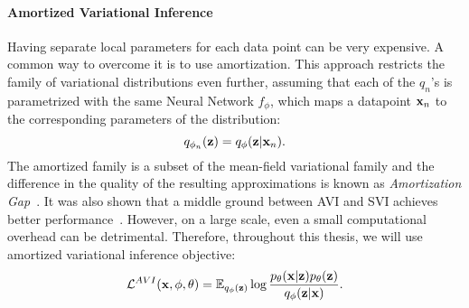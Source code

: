 \paragraph{Amortized Variational Inference}
Having separate local parameters for each data point can be very expensive. 
A common way to overcome it is to use amortization. This approach restricts the family of variational distributions even further, assuming that each of the $q_n$'s is parametrized with the same Neural Network $f_{\phi}$, which maps a datapoint ${\mathbf{x}}_n$ to the corresponding parameters of the distribution: 
\begin{equation}
    q_{\phi_n}({\mathbf{z}}) = q_{\phi}({\mathbf{z}} |{\mathbf{x}}_n).
\end{equation}
The amortized family is a subset of the mean-field variational family and the difference in the quality of the resulting approximations is known as \textit{Amortization Gap}~\citep{cremer2018inference}. It was also shown that a middle ground between AVI and SVI achieves better performance~\citep{kim2018semi}. However, on a large scale, even a small computational overhead can be detrimental. Therefore, throughout this thesis, we will use amortized variational inference objective:
\begin{equation}\label{eq:intro_avi}
     \mathcal{L}^{AVI}(\rvx, \phi, \theta) =  \E_{q_{\phi}(\rvz)}\log  \frac{p_{\theta}(\rvx|\rvz)p_{\theta}(\rvz)}{q_{\phi}(\rvz|\rvx)}.
\end{equation}

